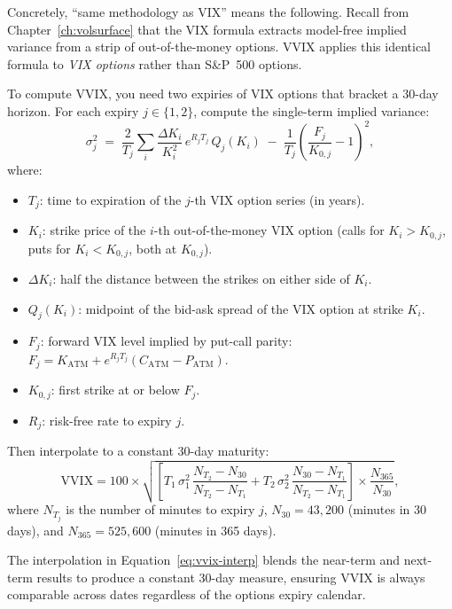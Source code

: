 Concretely, ``same methodology as VIX'' means the following.
Recall from Chapter~\ref{ch:volsurface} that the VIX formula extracts model-free implied variance from a strip of out-of-the-money options.
VVIX applies this identical formula to \emph{VIX options} rather than S\&P~500 options.

To compute VVIX, you need two expiries of VIX options that bracket a 30-day horizon.
For each expiry $j \in \{1, 2\}$, compute the single-term implied variance:
\begin{equation}\label{eq:vvix-single-term}
\sigma_j^2 \;=\; \frac{2}{T_j}\sum_{i}\frac{\Delta K_i}{K_i^2}\,e^{R_j T_j}\,Q_j(K_i)
  \;-\; \frac{1}{T_j}\!\left(\frac{F_j}{K_{0,j}} - 1\right)^{\!2},
\end{equation}
where:
\begin{itemize}[nosep]
  \item $T_j$: time to expiration of the $j$-th VIX option series (in years).
  \item $K_i$: strike price of the $i$-th out-of-the-money VIX option (calls for $K_i > K_{0,j}$, puts for $K_i < K_{0,j}$, both at $K_{0,j}$).
  \item $\Delta K_i$: half the distance between the strikes on either side of $K_i$.
  \item $Q_j(K_i)$: midpoint of the bid-ask spread of the VIX option at strike $K_i$.
  \item $F_j$: forward VIX level implied by put-call parity: $F_j = K_{\text{ATM}} + e^{R_j T_j}(C_{\text{ATM}} - P_{\text{ATM}})$.
  \item $K_{0,j}$: first strike at or below $F_j$.
  \item $R_j$: risk-free rate to expiry $j$.
\end{itemize}

Then interpolate to a constant 30-day maturity:
\begin{equation}\label{eq:vvix-interp}
\text{VVIX} = 100 \times \sqrt{\left[
  T_1\,\sigma_1^2\,\frac{N_{T_2} - N_{30}}{N_{T_2} - N_{T_1}}
  + T_2\,\sigma_2^2\,\frac{N_{30} - N_{T_1}}{N_{T_2} - N_{T_1}}
\right] \times \frac{N_{365}}{N_{30}}},
\end{equation}
where $N_{T_j}$ is the number of minutes to expiry $j$, $N_{30} = 43{,}200$ (minutes in 30 days), and $N_{365} = 525{,}600$ (minutes in 365 days).

\begin{intuition}
The interpolation in Equation~\eqref{eq:vvix-interp} blends the near-term and next-term results to produce a constant 30-day measure, ensuring VVIX is always comparable across dates regardless of the options expiry calendar.
\end{intuition}

